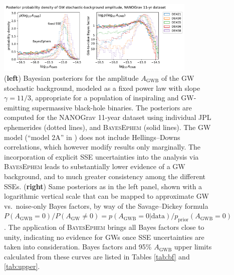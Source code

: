 \documentclass[iop,apj,twocolappendix]{emulateapj}
\begin{document}
\begin{figure}[t]
\begin{center}
    \includegraphics[width=0.85\textwidth]{figures/GWposterior.pdf}
\end{center}
\vspace{-12pt}
    \caption{(\textbf{left}) Bayesian posteriors for the amplitude $A_\mathrm{GWB}$ of the GW stochastic background, modeled as a fixed power law with slope $\gamma = 11/3$, appropriate for a population of inspiraling and GW-emitting supermassive black-hole binaries. The posteriors are computed for the NANOGrav 11-year dataset using individual JPL ephemerides (dotted lines), and \textsc{BayesEphem} (solid lines). The GW model (``model 2A'' in \citealt{2018ApJ...859...47A}) does not include Hellings--Downs correlations, which however modify results only marginally.
    The incorporation of explicit SSE uncertainties into the analysis via \textsc{BayesEphem} leads to substantially lower evidence of a GW background, and to much greater consistency among the different SSEs.
    (\textbf{right}) Same posteriors as in the left panel, shown with a logarithmic vertical scale that can be mapped to approximate GW vs.\ noise-only Bayes factors, by way of the Savage--Dickey formula $P(A_\mathrm{GWB}=0)/P(A_\mathrm{GW}\neq 0) = p(A_\mathrm{GWB}=0|\mathrm{data})/p_\mathrm{prior}(A_\mathrm{GWB}=0)$ \citep{d71}.
    The application of \textsc{BayesEphem} brings all Bayes factors close to unity, indicating no evidence for GWs once SSE uncertainties are taken into consideration.
    Bayes factors and 95\% $A_\mathrm{GWB}$  upper limits calculated from these curves are listed in Tables \ref{tab:bf} and \ref{tab:upper}.
    \label{fig:posteriors}}
\end{figure}
\end{document}
